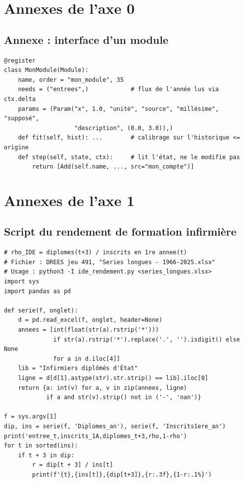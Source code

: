 \section{Annexes de l'axe 0}
\subsection{Annexe : interface d'un module}
\begin{verbatim}
@register
class MonModule(Module):
    name, order = "mon_module", 35
    needs = ("entrees",)            # flux de l'année lus via ctx.delta
    params = (Param("x", 1.0, "unité", "source", "millésime", "supposé",
                    "description", (0.0, 3.0)),)
    def fit(self, hist): ...        # calibrage sur l'historique <= origine
    def step(self, state, ctx):     # lit l'état, ne le modifie pas
        return [Add(self.name, ..., src="mon_compte")]
\end{verbatim}

\section{Annexes de l'axe 1}
\subsection{Script du rendement de formation infirmière}\label{a1-app:script}
\begin{verbatim}
# rho_IDE = diplomes(t+3) / inscrits en 1re annee(t)
# Fichier : DREES jeu 491, "Series longues - 1966-2025.xlsx"
# Usage : python3 -I ide_rendement.py <series_longues.xlsx>
import sys
import pandas as pd

def serie(f, onglet):
    d = pd.read_excel(f, onglet, header=None)
    annees = [int(float(str(a).rstrip('*')))
              if str(a).rstrip('*').replace('.', '').isdigit() else None
              for a in d.iloc[4]]
    lib = "Infirmiers diplômés d'État"
    ligne = d[d[1].astype(str).str.strip() == lib].iloc[0]
    return {a: int(v) for a, v in zip(annees, ligne)
            if a and str(v).strip() not in ('-', 'nan')}

f = sys.argv[1]
dip, ins = serie(f, 'Diplomes_an'), serie(f, 'Inscrits1ere_an')
print('entree_t,inscrits_1A,diplomes_t+3,rho,1-rho')
for t in sorted(ins):
    if t + 3 in dip:
        r = dip[t + 3] / ins[t]
        print(f'{t},{ins[t]},{dip[t+3]},{r:.3f},{1-r:.1%}')
\end{verbatim}

